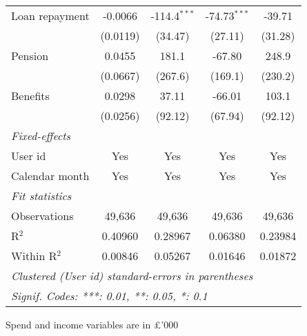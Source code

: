 \begin{table}[htbp]
\begin{threeparttable}[b]
\begin{tabular}{lcccc}
         Loan repayment       & -0.0066            & -114.4$^{***}$ & -74.73$^{***}$ & -39.71\\   
                              & (0.0119)           & (34.47)        & (27.11)        & (31.28)\\   
         Pension              & 0.0455             & 181.1          & -67.80         & 248.9\\   
                              & (0.0667)           & (267.6)        & (169.1)        & (230.2)\\   
         Benefits             & 0.0298             & 37.11          & -66.01         & 103.1\\   
                              & (0.0256)           & (92.12)        & (67.94)        & (92.12)\\   
         \midrule
         \emph{Fixed-effects}\\
         User id              & Yes                & Yes            & Yes            & Yes\\  
         Calendar month       & Yes                & Yes            & Yes            & Yes\\  
         \midrule
         \emph{Fit statistics}\\
         Observations         & 49,636             & 49,636         & 49,636         & 49,636\\  
         R$^2$                & 0.40960            & 0.28967        & 0.06380        & 0.23984\\  
         Within R$^2$         & 0.00846            & 0.05267        & 0.01646        & 0.01872\\  
         \midrule \midrule
         \multicolumn{5}{l}{\emph{Clustered (User id) standard-errors in parentheses}}\\
         \multicolumn{5}{l}{\emph{Signif. Codes: ***: 0.01, **: 0.05, *: 0.1}}\\
      \end{tabular}
      
      \begin{tablenotes}\footnotesize
         \item Spend and income variables are in \pounds'000
      \end{tablenotes}
   \end{threeparttable}
\end{table}


